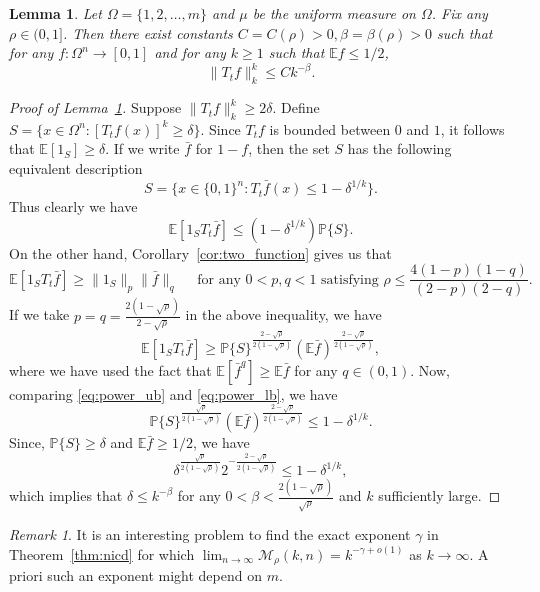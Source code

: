 \documentclass[11pt]{amsart}
\newcommand{\E}{\mathbb{E}}
\newcommand{\PP}{\mathbb{P}}
\newcommand{\bn}{\{0, 1\}^n}
\newcommand{\1}{\mathbf{1}}
\newcommand{\cf}{\bar{f}}
\def\E{{\mathbb E}}
\theoremstyle{definition}
\theoremstyle{plain}
\newtheorem{lemma}[example]{Lemma}
\theoremstyle{remark}
\newtheorem{remark}[example]{Remark}
\numberwithin{equation}{section}
\begin{document}
\begin{lemma} \label{lem:power}   Let $\Omega  = \{1, 2, \ldots, m\}$ and $\mu$ be the uniform measure on $\Omega$. Fix any $\rho \in (0,1]$.  Then there exist constants $C = C(\rho)>0, \beta = \beta(\rho) >0$  such that for any $f : \Omega^n \to [0,1]$ and for any $k \ge 1$ such that $\E f \le 1/2$,
\[ \| T_t f \|_k^k  \le Ck^{-\beta}.  \]
\end{lemma}

\begin{proof}[Proof of Lemma~\ref{lem:power}]
Suppose $  \| T_t f \|_k^k \ge 2\delta$. Define $S = \{ x \in \Omega^n :  [T_t f(x)]^k \ge \delta \}$. Since $T_t f$ is bounded between $0$ and $1$, it follows that $\E [1_S]  \ge \delta$. If we write $\cf$  for $1- f$, then the set $S$ has the following equivalent description
\[ S = \{  x \in \bn :  T_t \cf(x) \le 1 - \delta^{1/k} \}.\]
Thus clearly we have
\begin{equation}  \label{eq:power_ub}
\E [1_S T_t \cf] \le (1 - \delta^{1/k}) \PP\{ S\}.
\end{equation}
On the other hand,  Corollary~\ref{cor:two_function} gives us that
\begin{equation*}
\E [ 1_S T_t \cf] \ge  \| 1_S \|_p \| \cf \|_q \quad \text{ for any } 0 < p, q<1 \text{ satisfying } \rho \le \frac{4(1-p)(1-q)}{(2-p)(2-q)}.
\end{equation*}
If we take $ p = q = \frac{2(1 - \sqrt \rho)}{2 - \sqrt \rho}$ in the above inequality, we have
\begin{equation}  \label{eq:power_lb}
\E [1_S T_t \cf] \ge  \PP \{ S\}^{ \frac{ 2 - \sqrt \rho} {2(1- \sqrt \rho)}} (\E \cf)^{\frac{ 2 - \sqrt \rho} {2(1- \sqrt \rho)}}, \end{equation}
where we have used the fact that $ \E[ \cf^q ]\ge \E \cf$ for any $q \in (0, 1)$. Now, comparing  \eqref{eq:power_ub} and  \eqref{eq:power_lb}, we have
\[ \PP \{ S\}^{ \frac{  \sqrt \rho} {2(1- \sqrt \rho)}}   (\E \cf)^{\frac{ 2 - \sqrt \rho} {2(1- \sqrt \rho)} } \le 1 - \delta^{1/k}.\]
Since, $\PP \{S\} \ge \delta$ and $ \E \cf \ge 1/2$, we have
\[ \delta^{ \frac{  \sqrt \rho} {2(1- \sqrt \rho)}}  2^{- \frac{ 2 - \sqrt \rho} {2(1- \sqrt \rho)} } \le 1 - \delta^{1/k},\]
which implies that $\delta  \le  k^{-\beta}$ for any  $0< \beta <  \frac{2(1- \sqrt \rho)} {  \sqrt \rho} $ and $k$ sufficiently large.
\end{proof}
\begin{remark}
 It is an interesting problem to find the exact exponent $\gamma$ in Theorem~\ref{thm:nicd}  for which   $ \lim_{ n \to \infty} \mathcal M_\rho(k, n) = k^{-\gamma+o(1)}$ as $k \to \infty$. A priori such an exponent might depend on $m$. 
\end{remark}
\end{document}
